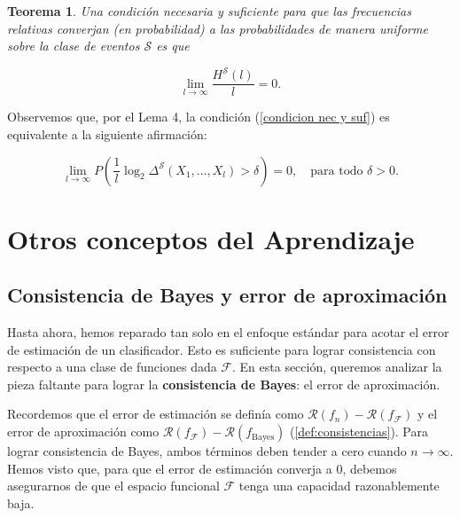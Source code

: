 \documentclass{report}
\newtheorem{thm}{Teorema}[subsection]
\begin{document}
\begin{thm}
    Una condición necesaria y suficiente para que las frecuencias relativas converjan (en probabilidad) a 
    las probabilidades de manera uniforme sobre la clase de eventos \( \mathcal{S} \) es que  
    
    \begin{equation}
    \lim_{l \to \infty} \frac{H^{\mathcal{S}}(l)}{l} = 0. \label{condicion nec y suf}
    \end{equation}
\end{thm}
    
    Observemos que, por el Lema 4, la condición (\ref{condicion nec y suf}) es equivalente a la siguiente afirmación:  
    
\begin{equation}
    \lim_{l \to \infty} P\left( \frac{1}{l}\log_2 \Delta^{\mathcal{S}}(X_1, \dots, X_l) > \delta  \right) = 0, 
    \quad \text{para todo } \delta > 0.
\end{equation}
    
    











\chapter{Otros conceptos del Aprendizaje}
\section{Consistencia de Bayes y error de aproximación}

Hasta ahora, hemos reparado tan solo en el enfoque estándar para acotar el error de estimación 
de un clasificador. Esto es suficiente para lograr consistencia con respecto a una clase de funciones 
dada \(\mathcal{F}\). En esta sección, queremos analizar la pieza faltante para lograr la 
\textbf{consistencia de Bayes}: el error de aproximación.\newline

Recordemos que el error de estimación se definía como \(\mathcal{R}(f_n) - \mathcal{R}(f_{\mathcal{F}})\) 
y el error de aproximación como \(\mathcal{R}(f_{\mathcal{F}}) - \mathcal{R}(f_{\text{Bayes}})\) 
(\ref{def:consistencias}). Para lograr consistencia de Bayes, ambos términos deben tender a cero cuando 
\(n \to \infty\). Hemos visto que, para que el error de estimación converja a \(0\), debemos 
asegurarnos de que el espacio funcional \(\mathcal{F}\) tenga una capacidad razonablemente baja.\newline
\end{document}
